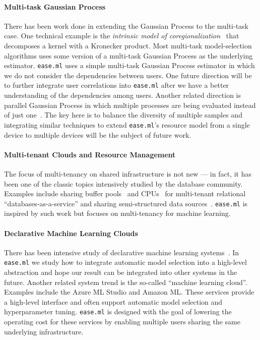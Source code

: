 \documentclass[letterpaper]{vldb}
\newcommand{\eml}{\texttt{ease.ml}\xspace}
\begin{document}
\vspace{-1em}
\paragraph*{Multi-task Gaussian Process}
There has been work done in extending the Gaussian Process to the 
multi-task case. One technical example is the {\em intrinsic model
of coregionalization}~\cite{Goovaerts1997} that decomposes
a kernel with a Kronecker product. Most 
multi-task model-selection algorithms uses some version of
a multi-task Gaussian Process as the underlying estimator.
\eml uses a simple multi-task Gaussian Process estimator in which we
do not consider the dependencies between users. One 
future direction will be to further integrate user correlations 
into \eml after we have a better understanding of the dependencies
 among users.
Another related direction is parallel Gaussian Process in which multiple
processes are being evaluated instead of just one~\cite{Desautels2014}.
The key here is to balance the diversity of multiple samples
and integrating similar techniques
to extend \eml's resource model from a single device to multiple devices will be the subject of future work.

\vspace{-1em}
\paragraph*{Multi-tenant Clouds and Resource Management}
The focus of multi-tenancy on shared infrastructure is not new ---
in fact, it has been one of the classic topics intensively
studied by the database community. Examples include
sharing buffer pools~\cite{Narasayya2015} and CPUs~\cite{Das2013}
for multi-tenant relational ``databases-as-a-service''
and sharing semi-structured data sources~\cite{Bellare2013}.
\eml is inspired by such work but focuses on
multi-tenancy for machine learning.

\vspace{-1em}
\paragraph*{Declarative Machine Learning Clouds} 
There has been intensive study of declarative
machine learning systems~\cite{Boehm2016a,Meng2001,Alexandrov2015,Abadi2016,Low2012,Hellerstein:2012:VLDB,Sparks2017}. In \eml we 
study how to integrate automatic model selection into
a high-level abstraction and hope our result can be integrated
into other systems in the future.
Another related system trend is the so-called ``machine learning
cloud''. Examples include the Azure ML Studio
and Amazon ML. These services
provide a high-level interface and often support automatic model selection
and hyperparameter tuning. \eml is designed with the goal of
lowering the operating cost for these services 
by enabling multiple users sharing the same underlying 
infrastructure.
\end{document}
